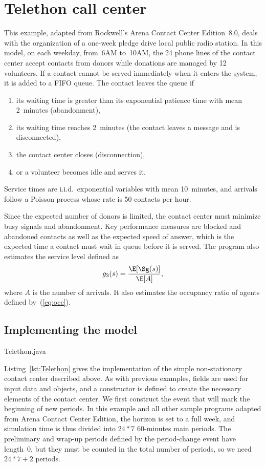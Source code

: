 \section{Telethon call center}
\label{sec:Telethon}

This example, adapted from Rockwell's Arena Contact Center
Edition~8.0,
deals with the organization of a one-week pledge drive
local public radio station.  In this model,
on each weekday, from~6AM to~10AM,
the 24 phone lines of the contact
center accept contacts from donors while donations are managed by 12
volunteers.
If a contact cannot be served immediately when it enters the system,
it is added to a FIFO queue.  The contact
leaves the queue if
\begin{enumerate}
\item its waiting time is greater than its exponential
patience time with mean 2~minutes (abandonment),
\item its waiting time reaches 2~minutes (the contact leaves a message
  and is disconnected),
\item the contact center closes (disconnection),
\item or a volunteer becomes idle and serves it.
\end{enumerate}
Service times are i.i.d.\ exponential variables with mean
10~minutes, and arrivals follow a Poisson process whose
rate is 50 contacts per hour.

Since the expected number of
donors is limited, the contact center must minimize busy signals and
abandonment.  Key performance measures are blocked and abandoned
contacts as well as the expected speed of answer, which
is the expected time a contact must wait in queue
before it is served.
The program also estimates the service level defined as
\begin{equation}
g_3(s)=\frac{\E[\Sg(s)]}{\E[A]},\label{eq:slarena}
\end{equation}
where $A$ is the number of arrivals.
It also estimates the occupancy ratio of agents defined by~(\ref{eq:occ}).

\subsection{Implementing the model}


{Telethon.java}

Listing~\ref{lst:Telethon} gives the
implementation of the simple non-stationary contact center described
above.
As with previous examples, fields are used for input data and objects,
and a constructor is defined to create the
necessary elements of the contact center.
We first construct the event that will mark the beginning of new
periods.
In this example and all other sample programs adapted from Arena
Contact Center Edition, the horizon is set to a full week, and
simulation time is thus divided into
$24*7$ 60-minutes main periods.
The preliminary and wrap-up periods defined by the
period-change event have length~0, but they must be counted
in the total
number of periods, so we need $24*7+2$ periods.

